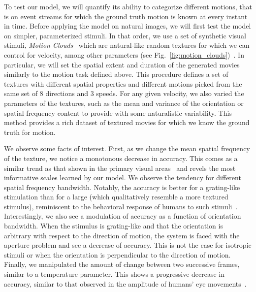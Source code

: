\documentclass[default]{sn-jnl}%
\theoremstyle{thmstyleone}%
\theoremstyle{thmstyletwo}%
\theoremstyle{thmstylethree}%
\newcommand{\seeFig}[1]{see Fig.~\ref{fig:#1}}%
\begin{document}
To test our model, we will quantify its ability to categorize different motions, that is on event streams for which the ground truth motion is known at every instant in time. Before applying the model on natural images, we will first test the model on simpler, parameterized stimuli. In that order, we use a set of synthetic visual stimuli, \textit{Motion Clouds}~\citep{leon_motion_2012} which are natural-like random textures for which we can control for velocity, among other parameters (\seeFig{motion_clouds})~\citep{vacher_bayesian_2018}. In particular, we will set the spatial extent and duration of the generated movies similarly to the motion task defined above. This procedure defines a set of textures with different spatial properties and different motions picked from the same set of $8$ directions and $3$ speeds. For any given velocity, we also varied the parameters of the textures, such as the mean and variance of the orientation or spatial frequency content to provide with some naturalistic variability. This method provides a rich dataset of textured movies for which we know the ground truth for motion.

We observe some facts of interest. First, as we change the mean spatial frequency of the texture, we notice a monotonous decrease in accuracy. This comes as a similar trend as that shown in the primary visual areas~\citep{priebe_tuning_2006} and revels the most informative scales learned by our model. We observe the tendency for different spatial frequency bandwidth. Notably, the accuracy is better for a grating-like stimulation than for a large (which qualitatively resemble a more textured stimulus), reminiscent to the behavioral response of humans to such stimuli~\citep{simoncini_more_2012, ravello_speed-selectivity_2019}. Interestingly, we also see a modulation of accuracy as a function of orientation bandwidth. When the stimulus is grating-like and that the orientation is arbitrary with respect to the direction of motion, the system is faced with the aperture problem and see a decrease of accuracy. This is not the case for isotropic stimuli or when the orientation is perpendicular to the direction of motion. Finally, we manipulated the amount of change between two successive frames, similar to a temperature parameter. This shows a progressive decrease in accuracy, similar to that observed in the amplitude of humans' eye movements~\citep{mansour_pour_speed_2018}. %
%
\end{document}
